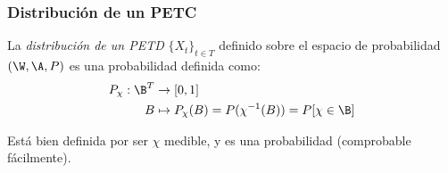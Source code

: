 \subsubsection{Distribución de un PETC}

\begin{ndef}
  La \emph{distribución de un PETD} $\{X_t\}_{t \in T}$ definido sobre el espacio de probabilidad $(\W, \A, P)$ es una probabilidad definida como:
  \begin{align*}
    P_\chi : \B^T & \to [0, 1] \\
    B & \mapsto P_\chi(B) = P(\chi^{-1}(B)) = P[\chi \in \B]
  \end{align*}
\end{ndef}

Está bien definida por ser $\chi$ medible, y es una probabilidad (comprobable fácilmente).


